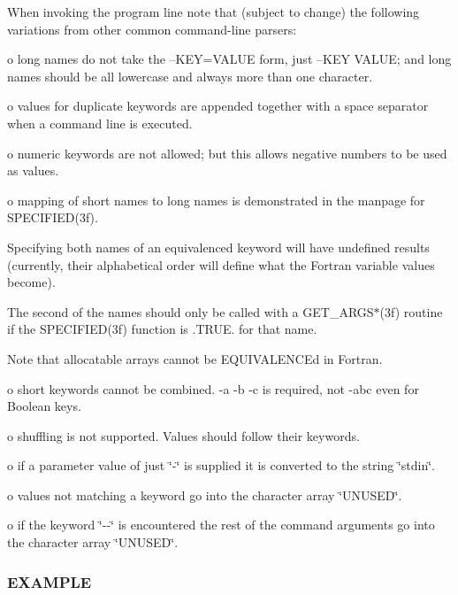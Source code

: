 When invoking the program line note that (subject to change) the following variations from other common command-\/line parsers\+:

o long names do not take the --K\+EY=V\+A\+L\+UE form, just --K\+EY V\+A\+L\+UE; and long names should be all lowercase and always more than one character.

o values for duplicate keywords are appended together with a space separator when a command line is executed.

o numeric keywords are not allowed; but this allows negative numbers to be used as values.

o mapping of short names to long names is demonstrated in the manpage for S\+P\+E\+C\+I\+F\+I\+E\+D(3f).

Specifying both names of an equivalenced keyword will have undefined results (currently, their alphabetical order will define what the Fortran variable values become).

The second of the names should only be called with a G\+E\+T\+\_\+\+A\+R\+G\+S$\ast$(3f) routine if the S\+P\+E\+C\+I\+F\+I\+E\+D(3f) function is .T\+R\+UE. for that name.

Note that allocatable arrays cannot be E\+Q\+U\+I\+V\+A\+L\+E\+N\+C\+Ed in Fortran.

o short keywords cannot be combined. -\/a -\/b -\/c is required, not -\/abc even for Boolean keys.

o shuffling is not supported. Values should follow their keywords.

o if a parameter value of just \char`\"{}-\/\char`\"{} is supplied it is converted to the string \char`\"{}stdin\char`\"{}.

o values not matching a keyword go into the character array \char`\"{}\+U\+N\+U\+S\+E\+D\char`\"{}.

o if the keyword \char`\"{}-\/-\/\char`\"{} is encountered the rest of the command arguments go into the character array \char`\"{}\+U\+N\+U\+S\+E\+D\char`\"{}. \subsubsection*{E\+X\+A\+M\+P\+LE}

